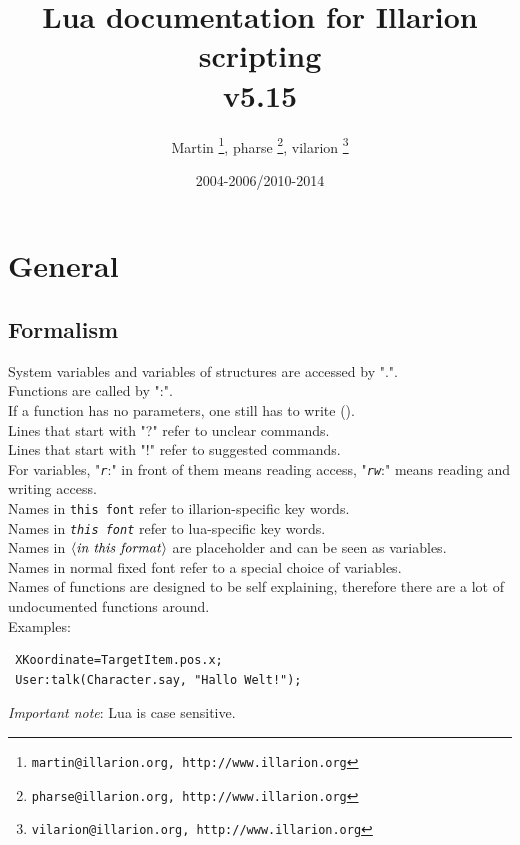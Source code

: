 \documentclass[a4paper,10pt,makeidx]{scrreprt}
\newcommand{\comm}[1]{\index{#1}\texttt{#1}}
\newcommand{\var}[1]{$\left\langle \text{\emph{#1}} \right\rangle$}
\newcommand{\lua}[1]{\index{#1}\texttt{\emph{#1}}}
\begin{document}
\lstset{basicstyle=\small, keywordstyle=\ttfamily, identifierstyle=\ttfamily}
\title{Lua documentation for Illarion scripting\\v5.15}
\author{Martin \thanks{ \texttt{martin@illarion.org, http://www.illarion.org}},
pharse \thanks{ \texttt{pharse@illarion.org, http://www.illarion.org}},
vilarion \thanks{ \texttt{vilarion@illarion.org, http://www.illarion.org}}}
\date{2004-2006/2010-2014}
\maketitle
\tableofcontents
\chapter{General}
\section{Formalism}
System variables and variables of structures are accessed by ".".\\
Functions are called by ":".\\
If a function has no parameters, one still has to write ().\\
Lines that start with "?" refer to unclear commands.\\
Lines that start with "!" refer to suggested commands.\\
For variables, "\lua{r}:" in front of them means reading access, "\lua{rw}:" means reading and writing access.\\
Names in \comm{this font} refer to illarion-specific key words.\\
Names in \lua{this font} refer to lua-specific key words.\\
Names in \var{in this format} are placeholder and can be seen as variables.\\
Names in normal fixed font refer to a special choice of variables.\\
Names of functions are designed to be self explaining, therefore there are a lot of undocumented functions around.\\

Examples:\\
\begin{verbatim}
 XKoordinate=TargetItem.pos.x;
 User:talk(Character.say, "Hallo Welt!");
\end{verbatim}
\emph{Important note}: Lua is case sensitive.
\end{document}
